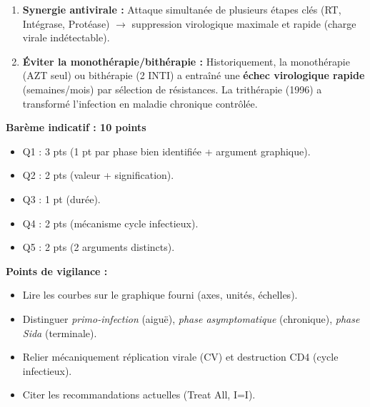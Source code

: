 \documentclass[11pt]{article}
\begin{document}
\begin{corrige}
\begin{enumerate}
\begin{enumerate}
\item \textbf{Synergie antivirale :} Attaque simultanée de plusieurs étapes clés (RT, Intégrase, Protéase) $\to$ suppression virologique maximale et rapide (charge virale indétectable).
\item \textbf{Éviter la monothérapie/bithérapie :} Historiquement, la monothérapie (AZT seul) ou bithérapie (2 INTI) a entraîné une \textbf{échec virologique rapide} (semaines/mois) par sélection de résistances. La trithérapie (1996) a transformé l'infection en maladie chronique contrôlée.
\end{enumerate}
\end{enumerate}
\end{corrige}

\begin{corrige}
\textbf{Barème indicatif : 10 points}
\begin{itemize}
\item Q1 : 3 pts (1 pt par phase bien identifiée + argument graphique).
\item Q2 : 2 pts (valeur + signification).
\item Q3 : 1 pt (durée).
\item Q4 : 2 pts (mécanisme cycle infectieux).
\item Q5 : 2 pts (2 arguments distincts).
\end{itemize}

\textbf{Points de vigilance :}
\begin{itemize}
\item Lire les courbes sur le graphique fourni (axes, unités, échelles).
\item Distinguer \emph{primo-infection} (aiguë), \emph{phase asymptomatique} (chronique), \emph{phase Sida} (terminale).
\item Relier mécaniquement réplication virale (CV) et destruction CD4 (cycle infectieux).
\item Citer les recommandations actuelles (Treat All, I=I).
\end{itemize}


\end{corrige}
\end{document}
